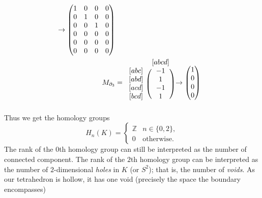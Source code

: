 \begin{example}
\begin{enumerate}
{\begin{align*}
\begin{blockarray}{ccccc}
                          \end{blockarray}
                          \to
                          \begin{pmatrix}
                              1 & 0 & 0 & 0 \\
                              0 & 1 & 0 & 0 \\
                              0 & 0 & 1 & 0 \\
                              0 & 0 & 0 & 0 \\
                              0 & 0 & 0 & 0 \\
                              0 & 0 & 0 & 0 \\
                          \end{pmatrix}        \\
                          M_{\partial_3} & =
                          \begin{blockarray}{cc}
                              & [abcd] \\
                              \begin{block}{c(c)}
                                  {[abc]} & -1 \\
                                  {[abd]} & 1  \\
                                  {[acd]} & -1 \\
                                  {[bcd]} & 1  \\
                              \end{block}
                          \end{blockarray}
                          \to
                          \begin{pmatrix}
                              1 \\ 0 \\ 0 \\ 0
                          \end{pmatrix}
                      \end{align*}
                  }
              Thus we get the homology groups
              \[
                  H_n(K) = \begin{cases}
                      \mathbb Z & n \in \{0, 2\},   \\
                      0         & \text{otherwise}.
                  \end{cases}
              \]
              The rank of the $0$th homology group can still be interpreted as the number of connected component. The rank of the $2$th homology group can be interpreted as the number of $2$-dimensional \emph{holes} in $K$ (or $S^2$); that is, the number of \emph{voids}. As our tetrahedron is hollow, it has one void (precisely the space the boundary encompasses)
    \end{enumerate}
\end{example}

